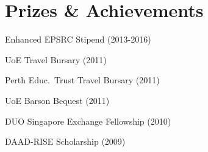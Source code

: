 \section{Prizes \& Achievements}
\vspace{-0.5cm}
\begin{multicols}{2}
\begin{itemize*}

\item Enhanced EPSRC Stipend (2013-2016)
\item UoE Travel Bursary (2011)
\item Perth Educ.\ Trust Travel Bursary (2011)
\item UoE Barson Bequest (2011)
\item DUO Singapore Exchange Fellowship (2010)
\item DAAD-RISE Scholarship (2009)

\end{itemize*}
\end{multicols}
